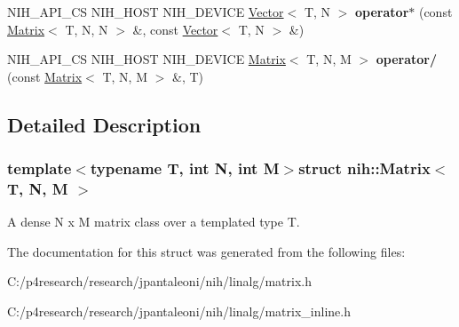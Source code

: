 \begin{DoxyCompactItemize}
\item 
\hypertarget{structnih_1_1_matrix_a02179c82f9486c57d27e245c57a87e53}{
\-N\-I\-H\-\_\-\-A\-P\-I\-\_\-\-C\-S \-N\-I\-H\-\_\-\-H\-O\-S\-T \-N\-I\-H\-\_\-\-D\-E\-V\-I\-C\-E \*
\hyperlink{structnih_1_1_vector}{\-Vector}$<$ \-T, \-N $>$ {\bfseries operator$\ast$} (const \hyperlink{structnih_1_1_matrix}{\-Matrix}$<$ \-T, \-N, \-N $>$ \&, const \hyperlink{structnih_1_1_vector}{\-Vector}$<$ \-T, \-N $>$ \&)}
\label{structnih_1_1_matrix_a02179c82f9486c57d27e245c57a87e53}

\item 
\hypertarget{structnih_1_1_matrix_a24d2f0d22492f9e3d3807af392e5fd12}{
\-N\-I\-H\-\_\-\-A\-P\-I\-\_\-\-C\-S \-N\-I\-H\-\_\-\-H\-O\-S\-T \-N\-I\-H\-\_\-\-D\-E\-V\-I\-C\-E \*
\hyperlink{structnih_1_1_matrix}{\-Matrix}$<$ \-T, \-N, \-M $>$ {\bfseries operator/} (const \hyperlink{structnih_1_1_matrix}{\-Matrix}$<$ \-T, \-N, \-M $>$ \&, \-T)}
\label{structnih_1_1_matrix_a24d2f0d22492f9e3d3807af392e5fd12}

\end{DoxyCompactItemize}


\subsection{\-Detailed \-Description}
\subsubsection*{template$<$typename \-T, int \-N, int \-M$>$struct nih\-::\-Matrix$<$ T, N, M $>$}

\-A dense \-N x \-M matrix class over a templated type \-T. 

\-The documentation for this struct was generated from the following files\-:\begin{DoxyCompactItemize}
\item 
\-C\-:/p4research/research/jpantaleoni/nih/linalg/matrix.\-h\item 
\-C\-:/p4research/research/jpantaleoni/nih/linalg/matrix\-\_\-inline.\-h\end{DoxyCompactItemize}
